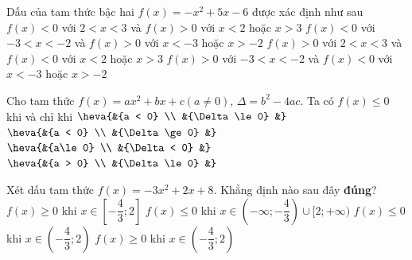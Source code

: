 \begin{ex}%
	Dấu của tam  thức bậc hai $f(x)=-x^2+5x-6$ được xác định như sau
	 \choice
		{$f(x) < 0$ với $2< x < 3$ và $f(x) > 0$ với $x < 2$ hoặc $x  > 3$}
		{$f(x) < 0$ với $-3< x  <-2$ và $f(x) > 0$ với $x <-3$ hoặc $x >-2$}
		{\True $f(x) > 0$ với $2< x < 3$ và $f(x) < 0$  với $x < 2$ hoặc $x > 3$}
		 {$f(x) > 0$ với $-3< x <-2$ và $f(x) < 0$ với $x <-3$ hoặc $x >-2$}
\end{ex}

\begin{ex}%
	Cho tam thức $f(x)=ax^2+bx+c\left(a\ne 0\right)$, $\Delta=b^2-4ac$. Ta có $f(x)\le 0$ khi  và chỉ khi
	\choice 
		{\True $\heva{&{a < 0} \\ 
		&{\Delta \le 0} 
		 &}$}
		{$\heva{&{a  < 0} \\
		&{\Delta \ge 0} 
		 &}$}
		{$\heva{&{a\le 0} \\ 
		 &{\Delta < 0}
		 &}$}
		 {$\heva{&{a > 0} \\
		 &{\Delta \le 0}
		&}$} 
\end{ex}

\begin{ex}%
	Xét  dấu tam thức $f(x)=-3x^2+2x+8$. Khẳng định nào sau đây \textbf{đúng}?
	\choice 
		{\True $f(x) \geq  0$ khi $x \in\left[-\dfrac{4}{3};2\right]$}
		{$f(x) \leq 0$ khi $x \in\left(-\infty;-\dfrac{4}{3}\right) \cup  [2;+\infty)$}
		{$f(x) \leq 0$ khi $x  \in\left(-\dfrac{4}{3};2\right)$}
		{$f(x) \geq 0$ khi $x \in\left(-\dfrac{4}{3};2\right)$} 
\end{ex}

